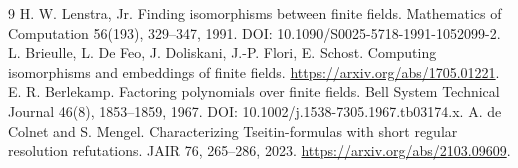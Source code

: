 \documentclass[11pt]{article}
\begin{document}
\begin{thebibliography}{9}
 H. W. Lenstra, Jr. Finding isomorphisms between finite
fields. Mathematics of Computation 56(193), 329--347, 1991.
DOI: 10.1090/S0025-5718-1991-1052099-2.
 L. Brieulle, L. De Feo, J. Doliskani, J.-P. Flori,
E. Schost. Computing isomorphisms and embeddings of finite fields.
\url{https://arxiv.org/abs/1705.01221}.
 E. R. Berlekamp. Factoring polynomials over finite
fields. Bell System Technical Journal 46(8), 1853--1859, 1967.
DOI: 10.1002/j.1538-7305.1967.tb03174.x.
 A. de Colnet and S. Mengel. Characterizing Tseitin-formulas
with short regular resolution refutations. JAIR 76, 265--286, 2023.
\url{https://arxiv.org/abs/2103.09609}.
\end{thebibliography}
\end{document}
